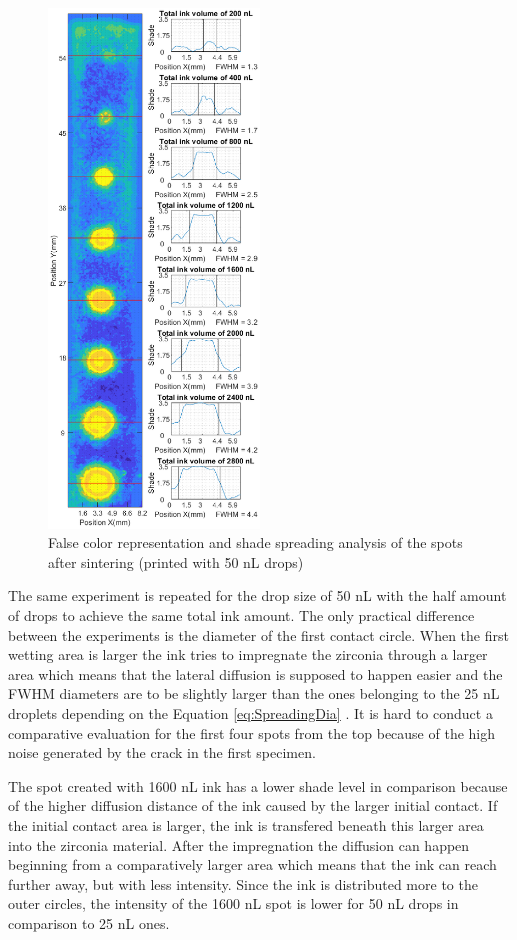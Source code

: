\begin{figure}[H]
	\centering
	\includegraphics[width=0.5\textwidth]{grafiken/drops50.eps}
	\caption{False color representation and shade spreading analysis of the spots after sintering (printed with 50 nL drops)}
	\label{fig:drops50}
\end{figure} 

\bigskip 
 The same experiment is repeated for the drop size of 50 nL with the half amount of drops to achieve the same total ink amount. The only practical difference between the experiments is the diameter of the first contact circle. When the first wetting area is larger the ink tries to impregnate the zirconia through a larger area which means that the lateral diffusion is supposed to happen easier and the FWHM diameters are to be slightly larger than the ones belonging to the 25 nL droplets depending on the Equation \ref{eq:SpreadingDia} . It is hard to conduct a comparative evaluation for the first four spots from the top because of the high noise generated by the crack in the first specimen. 
 
 The spot created with 1600 nL ink has a lower shade level in comparison because of the higher diffusion distance of the ink caused by the larger initial contact. If the initial contact area is larger, the ink is transfered beneath this larger area into the zirconia material. After the impregnation the diffusion can happen beginning from a comparatively larger area which means that the ink can reach further away, but with less intensity. Since the ink is distributed more to the outer circles, the intensity of the 1600 nL spot is lower for 50 nL drops in comparison to 25 nL ones.
  
